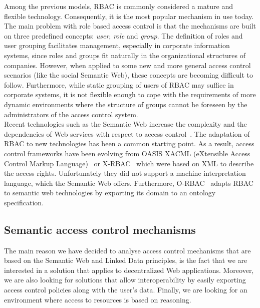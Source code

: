 Among the previous models, RBAC is commonly considered a mature and flexible technology. Consequently, it is the most popular mechanism in use today. The main problem with role based access control is that the mechanisms are built on three predefined concepts: \textit{user}, \textit{role} and \textit{group}. The definition of roles and user grouping facilitates management, especially in corporate information systems, since roles and groups fit naturally in the organizational structures of companies. However, when applied to some new and more general access control scenarios (like the social Semantic Web), these concepts are becoming difficult to follow. Furthermore, while static grouping of users of RBAC may suffice in corporate systems, it is not flexible enough to cope with the requirements of more dynamic environments where the structure of groups cannot be foreseen by the administrators of the access control system.\\

Recent technologies such as the Semantic Web increase the complexity and the dependencies of Web services with respect to access control~\cite{sohr2008analyzing}. The adaptation of RBAC to new technologies has been a common starting point. As a result, access control frameworks have been evolving from OASIS XACML (eXtensible Access Control Markup Language)~\cite{standard2010extensible} or X-RBAC~\cite{joshi2004access} which were based on XML to describe the access rights. Unfortunately they did not support a machine interpretation language, which the Semantic Web offers. Furthermore, O-RBAC~\cite{wu2006ontology} adapts RBAC to semantic web technologies by exporting its domain to an ontology specification.

\subsection{Semantic access control mechanisms}
\label{subsec:sem_acl}
The main reason we have decided to analyse access control mechanisms that are based on the Semantic Web and Linked Data principles, is the fact that we are interested in a solution that applies to decentralized Web applications. Moreover, we are also looking for solutions that allow interoperability by easily exporting access control policies along with the user's data. Finally, we are looking for an environment where access to resources is based on reasoning.\\

